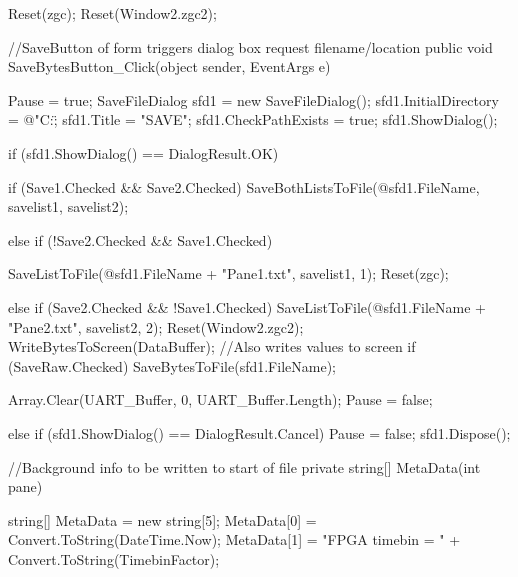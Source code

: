 {{{            Reset(zgc);
            Reset(Window2.zgc2);

        }

        //SaveButton of form triggers dialog box request filename/location
        public void SaveBytesButton_Click(object sender, EventArgs e)
        {

            Pause = true;
            SaveFileDialog sfd1 = new SaveFileDialog();
            sfd1.InitialDirectory = @"C:\";
            sfd1.Title = "SAVE";
            sfd1.CheckPathExists = true;
            sfd1.ShowDialog();

            if (sfd1.ShowDialog() == DialogResult.OK)
            {
                if (Save1.Checked && Save2.Checked)
                {
                    SaveBothListsToFile(@sfd1.FileName, savelist1, savelist2);
                }

                else if (!Save2.Checked && Save1.Checked)
                {

                    SaveListToFile(@sfd1.FileName + "Pane1.txt", savelist1, 1);
                    Reset(zgc);

                }
                else if (Save2.Checked && !Save1.Checked)
                {
                    SaveListToFile(@sfd1.FileName + "Pane2.txt", savelist2, 2);
                    Reset(Window2.zgc2);
                }
                WriteBytesToScreen(DataBuffer); //Also writes values to screen
                if (SaveRaw.Checked)
                {
                    SaveBytesToFile(sfd1.FileName);
                }

                Array.Clear(UART_Buffer, 0, UART_Buffer.Length);
                Pause = false;
            }
            else if (sfd1.ShowDialog() == DialogResult.Cancel)
            {
                Pause = false;
            }
            sfd1.Dispose();

        }

        //Background info to be written to start of file
        private string[] MetaData(int pane)
        {
            string[] MetaData = new string[5];
            MetaData[0] = Convert.ToString(DateTime.Now);
            MetaData[1] = "FPGA timebin = " + Convert.ToString(TimebinFactor);

}}}
